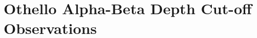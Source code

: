 \documentclass[12pt]{article}
\begin{document}
\maketitle

\section{Othello Alpha-Beta Depth Cut-off Observations}
\end{document}
